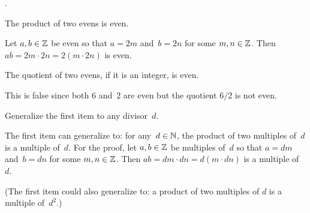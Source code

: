 \documentclass{ibl}  %
\begin{document}
\begin{problem} 
\pord.
\begin{exes}
\begin{exercise}
  The product of two evens is even.
\end{exercise}
\begin{answer}
  Let $a,b\in\mathbb{Z}$ be even
  so that $a=2m$ and~$b=2n$ for some $m,n\in\mathbb{Z}$.
  Then $ab=2m\cdot 2n=2(m\cdot 2n)$ is even.  
\end{answer}
\begin{exercise}
  The quotient of two evens, if it is an integer, is even.
\end{exercise}
\begin{answer}
  This is false since both $6$ and~$2$ are even but the quotient $6/2$
  is not even.
\end{answer}
\begin{exercise}[\midlength]
  Generalize the first item to any divisor~$d$.  
\end{exercise}
\begin{answer}
  The first item can generalize to: for any~$d\in\mathbb{N}$, 
  the product of two multiples of~$d$ is a multiple of~$d$.
  For the proof,  let $a,b\in\mathbb{Z}$ be multiples of~$d$
  so that $a=dm$ and~$b=dn$ for some $m,n\in\mathbb{Z}$.
  Then $ab=dm\cdot dn=d(m\cdot dn)$ is a multiple of~$d$.

  (The first item could also generalize to: a product of two multiples of
  $d$ is a multiple of~$d^2$.)
\end{answer}
\end{exes}
\end{problem}
\end{document}
